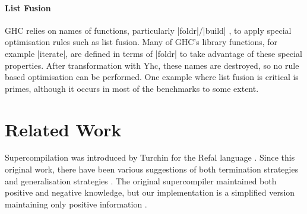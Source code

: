 \paragraph{List Fusion} GHC relies on names of functions, particularly |foldr|/|build| \cite{spj:rules}, to apply special optimisation rules such as list fusion. Many of GHC's library functions, for example |iterate|, are defined in terms of |foldr| to take advantage of these special properties. After transformation with Yhc, these names are destroyed, so no rule based optimisation can be performed. One example where list fusion is critical is primes, although it occurs in most of the benchmarks to some extent.

\section{Related Work}
\label{sec:related}

Supercompilation \cite{supercompilation,turchin:experiments} was introduced by Turchin for the Refal language \cite{refal}. Since this original work, there have been various suggestions of both termination strategies and generalisation strategies \cite{turchin:generalisation,sorensen:supercompilation,leuschel:homeomorphic}. The original supercompiler maintained both positive and negative knowledge, but our implementation is a simplified version maintaining only positive information \cite{secher:perfect_supercompilation}.

